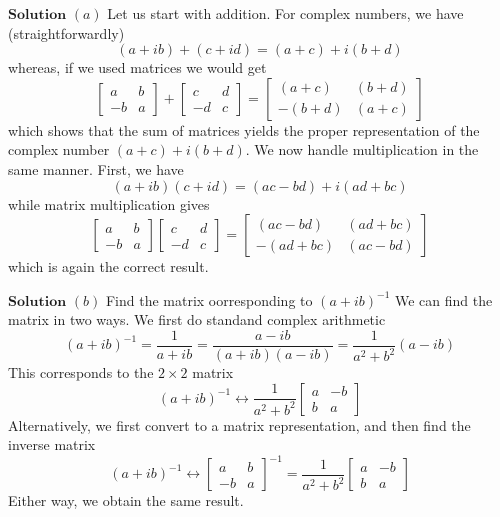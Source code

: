 \documentclass{styles/kaobook}
\begin{document}
$\boxed{\textbf{Solution}}$  $(a)$ Let us start with addition. For complex numbers, we have (straightforwardly)
$$
(a+i b)+(c+i d)=(a+c)+i(b+d)
$$
whereas, if we used matrices we would get
$$\begin{bmatrix}{a} & {b} \\ {-b} & {a}\end{bmatrix}+\begin{bmatrix}{c} & {d} \\ {-d} & {c}\end{bmatrix}=\begin{bmatrix}{(a+c)} & {(b+d)} \\ {-(b+d)} & {(a+c)}\end{bmatrix}$$
which shows that the sum of matrices yields the proper representation of the complex number $(a+c)+i(b+d)$. We now handle multiplication in the same manner. First, we have
$$(a+i b)(c+i d)=(a c-b d)+i(a d+b c)$$
while matrix multiplication gives
$$
\begin{bmatrix}{a} & {b} \\ {-b} & {a}\end{bmatrix}\begin{bmatrix}{c} & {d} \\ {-d} & {c}\end{bmatrix}=\begin{bmatrix}{(a c-b d)} & {(a d+b c)} \\ {-(a d+b c)} & {(a c-b d)}\end{bmatrix}
$$
which is again the correct result.




$\boxed{\textbf{Solution}}$  $(b)$ Find the matrix oorresponding to $(a+i b)^{-1}$ We can find the matrix in two ways. We first do standand complex arithmetic
$$
(a+i b)^{-1}=\frac{1}{a+i b}=\frac{a-i b}{(a+i b)(a-i b)}=\frac{1}{a^{2}+b^{2}}(a-i b)
$$
This corresponds to the $2 \times 2$ matrix
$$
(a+i b)^{-1} \longleftrightarrow \frac{1}{a^{2}+b^{2}}\begin{bmatrix}{a} & {-b} \\ {b} & {a}\end{bmatrix}
$$
Alternatively, we first convert to a matrix representation, and then find the inverse
matrix
$$
(a+i b)^{-1} \leftrightarrow\begin{bmatrix}{a} & {b} \\ {-b} & {a}\end{bmatrix}^{-1}=\frac{1}{a^{2}+b^{2}}\begin{bmatrix}{a} & {-b} \\ {b} & {a}\end{bmatrix}
$$
Either way, we obtain the same result.
\end{document}
